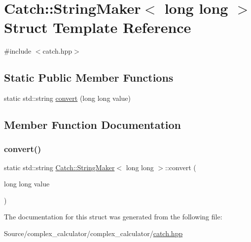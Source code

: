 \hypertarget{struct_catch_1_1_string_maker_3_01long_01long_01_4}{}\section{Catch\+:\+:String\+Maker$<$ long long $>$ Struct Template Reference}
\label{struct_catch_1_1_string_maker_3_01long_01long_01_4}


{\ttfamily \#include $<$catch.\+hpp$>$}

\subsection*{Static Public Member Functions}
\begin{DoxyCompactItemize}
\item 
static std\+::string \mbox{\hyperlink{struct_catch_1_1_string_maker_3_01long_01long_01_4_a7a58929dca2a14c576d7d6d08bc615d2}{convert}} (long long value)
\end{DoxyCompactItemize}


\subsection{Member Function Documentation}
\mbox{\label{struct_catch_1_1_string_maker_3_01long_01long_01_4_a7a58929dca2a14c576d7d6d08bc615d2}} 
\subsubsection{\texorpdfstring{convert()}{convert()}}
{\footnotesize\ttfamily static std\+::string \mbox{\hyperlink{struct_catch_1_1_string_maker}{Catch\+::\+String\+Maker}}$<$ long long $>$\+::convert (\begin{DoxyParamCaption}\item[{long long}]{value }\end{DoxyParamCaption})\hspace{0.3cm}{\ttfamily [static]}}



The documentation for this struct was generated from the following file\+:\begin{DoxyCompactItemize}
\item 
Source/complex\+\_\+calculator/complex\+\_\+calculator/\mbox{\hyperlink{catch_8hpp}{catch.\+hpp}}\end{DoxyCompactItemize}
